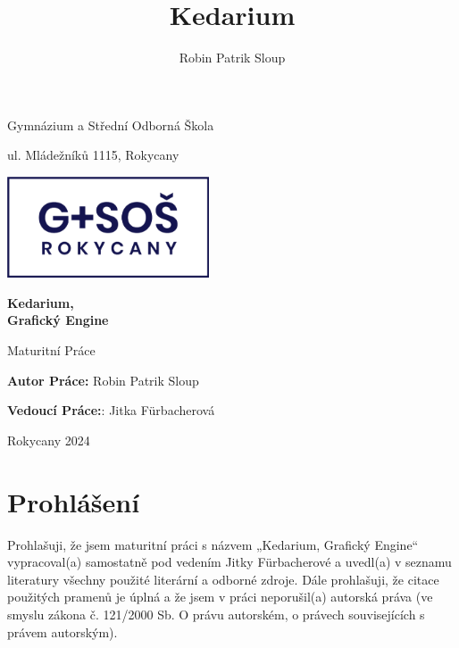 \documentclass[11pt]{article}
\title{Kedarium}
\author{Robin Patrik Sloup}
\begin{document}
\begin{titlepage}
	\begin{center}
		{\Large Gymnázium a Střední Odborná Škola\par}
		\vspace{0.2cm}
		ul. Mládežníků 1115, Rokycany
	\end{center}
	\thispagestyle{empty}
	\begin{center}
		\vspace{1cm}
		\includegraphics[height=3cm]{school-logo.png}\\
	\end{center}
	\vspace*{\fill}
	\begin{center}
		{\Huge \textbf{Kedarium,\\Grafický Engine}\par}
		\vspace{0.3cm}
		{\Large Maturitní Práce\par}
		\vspace{1.5cm}
	\end{center}
	\vspace*{\fill}
	\begin{minipage}[t]{0.45\textwidth}
		\raggedright
		\textbf{Autor Práce:} Robin Patrik Sloup
	\end{minipage}%
	\begin{minipage}[t]{0.45\textwidth}
		\raggedleft
		\textbf{Vedoucí Práce:}: Jitka Fürbacherová
	\end{minipage}
	\vspace{2cm}
	\begin{center}
		Rokycany 2024
	\end{center}
\end{titlepage}
\section{Prohlášení}
Prohlašuji, že jsem maturitní práci s názvem „Kedarium, Grafický Engine“ vypracoval(a) samostatně pod vedením Jitky Fürbacherové a uvedl(a) v seznamu literatury všechny použité literární a odborné
zdroje. Dále prohlašuji, že citace použitých pramenů je úplná a že jsem v práci neporušil(a)
autorská práva (ve smyslu zákona č. 121/2000 Sb. O právu autorském, o právech souvisejících
s právem autorským).
\end{document}

